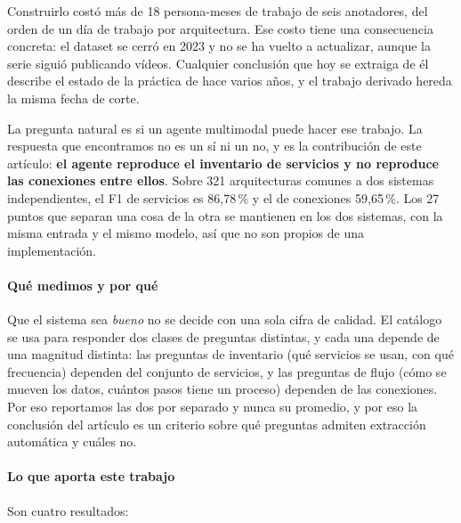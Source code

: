 \documentclass[a4paper, twocolumn, 10pt]{IEEEtran}
\begin{document}
Construirlo costó más de 18 persona-meses de trabajo de seis anotadores, del
orden de un día de trabajo por arquitectura. Ese costo tiene una consecuencia
concreta: el dataset se cerró en 2023 y no se ha vuelto a actualizar, aunque la
serie siguió publicando vídeos. Cualquier conclusión que hoy se extraiga de él
describe el estado de la práctica de hace varios años, y el trabajo derivado
hereda la misma fecha de corte.
 
La pregunta natural es si un agente multimodal puede hacer ese trabajo. La
respuesta que encontramos no es un sí ni un no, y es la contribución de este
artículo: \textbf{el agente reproduce el inventario de servicios y no reproduce
las conexiones entre ellos}. Sobre 321 arquitecturas comunes a dos sistemas
independientes, el F1 de servicios es 86,78\,\% y el de conexiones 59,65\,\%. Los
27 puntos que separan una cosa de la otra se mantienen en los dos sistemas, con
la misma entrada y el mismo modelo, así que no son propios de una implementación.
 
\paragraph{Qué medimos y por qué} Que el sistema sea \emph{bueno} no se decide
con una sola cifra de calidad. El catálogo se usa para responder dos clases de
preguntas distintas, y cada una depende de una magnitud distinta: las preguntas
de inventario (qué servicios se usan, con qué frecuencia) dependen del conjunto
de servicios, y las preguntas de flujo (cómo se mueven los datos, cuántos pasos
tiene un proceso) dependen de las conexiones. Por eso reportamos las dos por
separado y nunca su promedio, y por eso la conclusión del artículo es un criterio
sobre qué preguntas admiten extracción automática y cuáles no.
 
\paragraph{Lo que aporta este trabajo} Son cuatro resultados:
 
\end{document}
